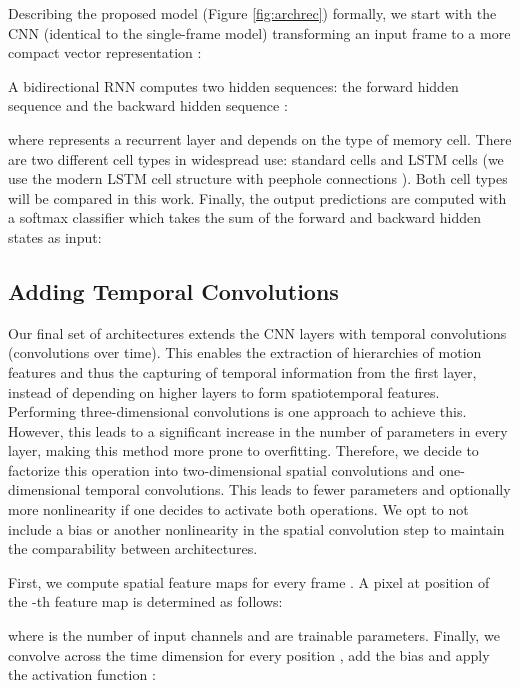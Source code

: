 \documentclass[11pt,a4paper]{article} \usepackage{a4wide}
\begin{document}
Describing the proposed model (Figure \ref{fig:archrec}) formally, we start with the CNN (identical to the single-frame model) transforming an input frame  to a more compact vector representation :

A bidirectional RNN computes two hidden sequences: the forward hidden sequence  and the backward hidden sequence :

where  represents a recurrent layer and depends on the type of memory cell. There are two different cell types in widespread use: standard cells and LSTM cells \citep{hochreiter1997long} (we use the modern LSTM cell structure with peephole connections \citep{gers2003learning}). Both cell types will be compared in this work.
Finally, the output predictions  are computed with a softmax classifier which takes the sum of the forward and backward hidden states as input:






\subsection{Adding Temporal Convolutions} \label{sec:3d}



Our final set of architectures extends the CNN layers with temporal convolutions (convolutions over time). This enables the extraction of hierarchies of motion features and thus the capturing of temporal information from the first layer, instead of depending on higher layers to form spatiotemporal features. Performing three-dimensional convolutions is one approach to achieve this. However, this leads to a significant increase in the number of parameters in every layer, making this method more prone to overfitting. Therefore, we decide to factorize this operation into two-dimensional spatial convolutions and one-dimensional temporal convolutions. This leads to fewer parameters and optionally more nonlinearity if one decides to activate both operations. We opt to not include a bias or another nonlinearity in the spatial convolution step to maintain the comparability between architectures.






First, we compute spatial feature maps  for every frame . A pixel at position  of the -th feature map is determined as follows:

where  is the number of input channels and  are trainable parameters. Finally, we convolve across the time dimension for every position , add the bias  and apply the activation function :
\end{document}
